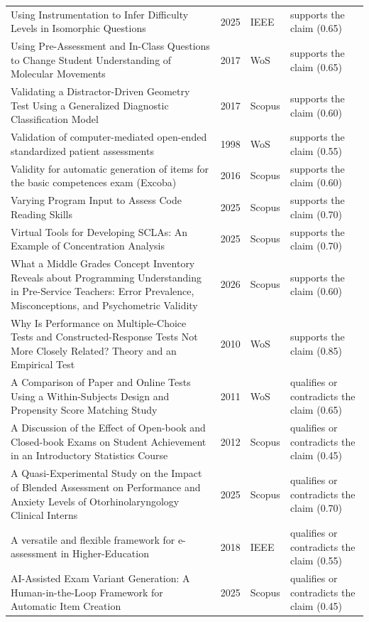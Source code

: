 \begin{longtable}{@{}%
  >{\raggedright\arraybackslash}p{}c%
  >{\raggedright\arraybackslash}p{}%
  >{\raggedright\arraybackslash}p{}@{}}
Using Instrumentation to Infer Difficulty Levels in Isomorphic Questions & 2025 & IEEE & supports the claim (0.65) \\
Using Pre-Assessment and In-Class Questions to Change Student Understanding of Molecular Movements & 2017 & WoS & supports the claim (0.65) \\
Validating a Distractor-Driven Geometry Test Using a Generalized Diagnostic Classification Model & 2017 & Scopus & supports the claim (0.60) \\
Validation of computer-mediated open-ended standardized patient assessments & 1998 & WoS & supports the claim (0.55) \\
Validity for automatic generation of items for the basic competences exam (Excoba) & 2016 & Scopus & supports the claim (0.60) \\
Varying Program Input to Assess Code Reading Skills & 2025 & Scopus & supports the claim (0.70) \\
Virtual Tools for Developing SCLAs: An Example of Concentration Analysis & 2025 & Scopus & supports the claim (0.70) \\
What a Middle Grades Concept Inventory Reveals about Programming Understanding in Pre-Service Teachers: Error Prevalence, Misconceptions, and Psychometric Validity & 2026 & Scopus & supports the claim (0.60) \\
Why Is Performance on Multiple-Choice Tests and Constructed-Response Tests Not More Closely Related? Theory and an Empirical Test & 2010 & WoS & supports the claim (0.85) \\
A Comparison of Paper and Online Tests Using a Within-Subjects Design and Propensity Score Matching Study & 2011 & WoS & qualifies or contradicts the claim (0.65) \\
A Discussion of the Effect of Open-book and Closed-book Exams on Student Achievement in an Introductory Statistics Course & 2012 & Scopus & qualifies or contradicts the claim (0.45) \\
A Quasi-Experimental Study on the Impact of Blended Assessment on Performance and Anxiety Levels of Otorhinolaryngology Clinical Interns & 2025 & Scopus & qualifies or contradicts the claim (0.70) \\
A versatile and flexible framework for e-assessment in Higher-Education & 2018 & IEEE & qualifies or contradicts the claim (0.55) \\
AI-Assisted Exam Variant Generation: A Human-in-the-Loop Framework for Automatic Item Creation & 2025 & Scopus & qualifies or contradicts the claim (0.45) \\

\end{longtable}
